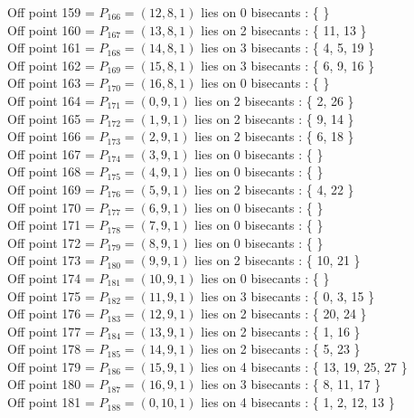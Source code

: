 \documentclass{article}
\begin{document}
{Off point 159 = $P_{166} = ( 12, 8, 1 )$ lies on 0 bisecants : \{  \}\\
Off point 160 = $P_{167} = ( 13, 8, 1 )$ lies on 2 bisecants : \{ 11, 13 \}\\
Off point 161 = $P_{168} = ( 14, 8, 1 )$ lies on 3 bisecants : \{ 4, 5, 19 \}\\
Off point 162 = $P_{169} = ( 15, 8, 1 )$ lies on 3 bisecants : \{ 6, 9, 16 \}\\
Off point 163 = $P_{170} = ( 16, 8, 1 )$ lies on 0 bisecants : \{  \}\\
Off point 164 = $P_{171} = ( 0, 9, 1 )$ lies on 2 bisecants : \{ 2, 26 \}\\
Off point 165 = $P_{172} = ( 1, 9, 1 )$ lies on 2 bisecants : \{ 9, 14 \}\\
Off point 166 = $P_{173} = ( 2, 9, 1 )$ lies on 2 bisecants : \{ 6, 18 \}\\
Off point 167 = $P_{174} = ( 3, 9, 1 )$ lies on 0 bisecants : \{  \}\\
Off point 168 = $P_{175} = ( 4, 9, 1 )$ lies on 0 bisecants : \{  \}\\
Off point 169 = $P_{176} = ( 5, 9, 1 )$ lies on 2 bisecants : \{ 4, 22 \}\\
Off point 170 = $P_{177} = ( 6, 9, 1 )$ lies on 0 bisecants : \{  \}\\
Off point 171 = $P_{178} = ( 7, 9, 1 )$ lies on 0 bisecants : \{  \}\\
Off point 172 = $P_{179} = ( 8, 9, 1 )$ lies on 0 bisecants : \{  \}\\
Off point 173 = $P_{180} = ( 9, 9, 1 )$ lies on 2 bisecants : \{ 10, 21 \}\\
Off point 174 = $P_{181} = ( 10, 9, 1 )$ lies on 0 bisecants : \{  \}\\
Off point 175 = $P_{182} = ( 11, 9, 1 )$ lies on 3 bisecants : \{ 0, 3, 15 \}\\
Off point 176 = $P_{183} = ( 12, 9, 1 )$ lies on 2 bisecants : \{ 20, 24 \}\\
Off point 177 = $P_{184} = ( 13, 9, 1 )$ lies on 2 bisecants : \{ 1, 16 \}\\
Off point 178 = $P_{185} = ( 14, 9, 1 )$ lies on 2 bisecants : \{ 5, 23 \}\\
Off point 179 = $P_{186} = ( 15, 9, 1 )$ lies on 4 bisecants : \{ 13, 19, 25, 27 \}\\
Off point 180 = $P_{187} = ( 16, 9, 1 )$ lies on 3 bisecants : \{ 8, 11, 17 \}\\
Off point 181 = $P_{188} = ( 0, 10, 1 )$ lies on 4 bisecants : \{ 1, 2, 12, 13 \}\\
}
\end{document}
